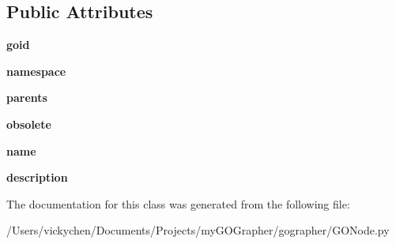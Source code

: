 \subsection*{Public Attributes}
\begin{DoxyCompactItemize}
\item 
\hypertarget{class_g_o_node_1_1_g_o_node_a419738231e6061c8f35c7038600045b5}{
{\bfseries goid}}
\label{class_g_o_node_1_1_g_o_node_a419738231e6061c8f35c7038600045b5}

\item 
\hypertarget{class_g_o_node_1_1_g_o_node_a14d769d661d7dad68b451d0ee40dc7c8}{
{\bfseries namespace}}
\label{class_g_o_node_1_1_g_o_node_a14d769d661d7dad68b451d0ee40dc7c8}

\item 
\hypertarget{class_g_o_node_1_1_g_o_node_a0e5b6b8b5e9b4a88ff0752017d90f544}{
{\bfseries parents}}
\label{class_g_o_node_1_1_g_o_node_a0e5b6b8b5e9b4a88ff0752017d90f544}

\item 
\hypertarget{class_g_o_node_1_1_g_o_node_a21c9f4840075c55ca91a59d4e7907f1f}{
{\bfseries obsolete}}
\label{class_g_o_node_1_1_g_o_node_a21c9f4840075c55ca91a59d4e7907f1f}

\item 
\hypertarget{class_g_o_node_1_1_g_o_node_a18b00948dd27ef1af426a1b8a522467d}{
{\bfseries name}}
\label{class_g_o_node_1_1_g_o_node_a18b00948dd27ef1af426a1b8a522467d}

\item 
\hypertarget{class_g_o_node_1_1_g_o_node_ad22366488d580d7aa91527f0b592d64d}{
{\bfseries description}}
\label{class_g_o_node_1_1_g_o_node_ad22366488d580d7aa91527f0b592d64d}

\end{DoxyCompactItemize}


The documentation for this class was generated from the following file:\begin{DoxyCompactItemize}
\item 
/Users/vickychen/Documents/Projects/myGOGrapher/gographer/GONode.py\end{DoxyCompactItemize}
